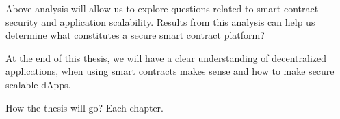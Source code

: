 Above analysis will allow us to explore questions related to smart contract security and application scalability. Results from this analysis can help us determine what constitutes a secure smart contract platform?

At the end of this thesis, we will have a clear understanding of decentralized applications, when using smart contracts makes sense and how to make secure scalable dApps.



How the thesis will go? Each chapter.
